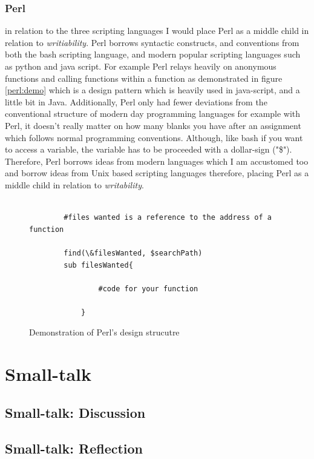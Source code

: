 \documentclass[
	12pt, %
]{fphw}
\begin{document}
\subsubsection{Perl} in relation to the three scripting languages I would place
Perl as a middle child in relation to \emph{writiability}. Perl borrows syntactic
constructs, and conventions from both the bash scripting language, and modern
popular scripting languages such as python and java script. For example Perl
relays heavily on anonymous functions and calling functions within a function
as demonstrated in figure \ref{perl:demo} which is a design
pattern which is heavily used in java-script, and a little bit in Java. Additionally,
Perl only had fewer deviations from the conventional structure of modern day programming languages
for example with Perl, it doesn't really matter on how many blanks you have after
an assignment which follows normal programming conventions. Although, like bash
if you want to access a variable, the variable has to be proceeded with a dollar-sign
("\$"). Therefore, Perl borrows ideas from modern languages which I am accustomed too
and borrow ideas from Unix based scripting languages therefore, placing Perl as
a middle child in relation to \emph{writability}.

\begin{figure}[!htp]
    \begin{problem}
        \begin{verbatim}

        #files wanted is a reference to the address of a function

        find(\&filesWanted, $searchPath)
        sub filesWanted{

                #code for your function

            }
        \end{verbatim}
    \end{problem}
    \caption{Demonstration of Perl's design strucutre}
    \label{Perl:demo}
\end{figure}

\section{Small-talk}

\subsection{Small-talk: Discussion}

\subsection{Small-talk: Reflection}
\end{document}
